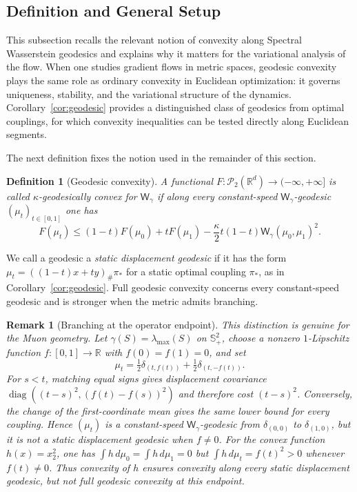 \documentclass{article}
\newtheorem{definition}[theorem]{Definition}
\newtheorem{remark}[theorem]{Remark}
\newcommand{\R}{\mathbb{R}}
\newcommand{\cP}{\mathcal{P}}
\newcommand{\Wg}{\mathsf{W}_{\gamma}}
\newcommand{\diag}{\operatorname{diag}}
\begin{document}
\subsection{Definition and General Setup}
This subsection recalls the relevant notion of convexity along Spectral Wasserstein geodesics and explains why it matters for the variational analysis of the flow.
When one studies gradient flows in metric spaces, geodesic convexity plays the
same role as ordinary convexity in Euclidean optimization: it governs
uniqueness, stability, and the variational structure of the dynamics.
Corollary~\ref{cor:geodesic} provides a distinguished class of geodesics from
optimal couplings, for which convexity inequalities can be tested directly
along Euclidean segments.

The next definition fixes the notion used in the remainder of this section.
\begin{definition}[Geodesic convexity]
\label{def:geoconvex}
A functional $F:\cP_2(\R^d)\to(-\infty,+\infty]$ is called $\kappa$-geodesically convex for $\Wg$ if along every constant-speed $\Wg$-geodesic $(\mu_t)_{t\in[0,1]}$ one has
$$
F(\mu_t)
\le
(1-t)F(\mu_0)+tF(\mu_1)
-\frac{\kappa}{2}t(1-t)\Wg(\mu_0,\mu_1)^2.
$$
\end{definition}

We call a geodesic a \emph{static displacement geodesic} if it has the form
$\mu_t=((1-t)x+ty)_\#\pi_*$ for a static optimal coupling $\pi_*$, as in
Corollary~\ref{cor:geodesic}. Full geodesic convexity concerns every
constant-speed geodesic and is stronger when the metric admits branching.

\begin{remark}[Branching at the operator endpoint]
This distinction is genuine for the Muon geometry. Let
$\gamma(S)=\lambda_{\max}(S)$ on $\mathbb S_+^2$, choose a nonzero
$1$-Lipschitz
function $f:[0,1]\to\R$ with $f(0)=f(1)=0$, and set
\[
 \mu_t=\tfrac12\delta_{(t,f(t))}+\tfrac12\delta_{(t,-f(t))}.
\]
For $s<t$, matching equal signs gives displacement covariance
$\diag((t-s)^2,(f(t)-f(s))^2)$ and therefore cost $(t-s)^2$. Conversely, the
change of the first-coordinate mean gives the same lower bound for every
coupling. Hence $(\mu_t)$ is a constant-speed $\Wg$-geodesic from
$\delta_{(0,0)}$ to $\delta_{(1,0)}$, but it is not a static displacement
geodesic when $f\ne0$. For the convex function $h(x)=x_2^2$, one has
$\int h\,d\mu_0=\int h\,d\mu_1=0$ but
$\int h\,d\mu_t=f(t)^2>0$ whenever $f(t)\ne0$. Thus convexity of $h$ ensures
convexity along every static displacement geodesic, but not full geodesic
convexity at this endpoint.
\end{remark}
\end{document}

